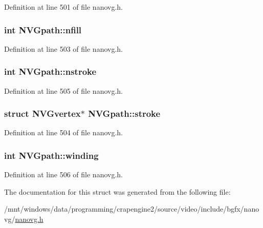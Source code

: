 Definition at line 501 of file nanovg.\+h.

\hypertarget{struct_n_v_gpath_a1301e4eaf5ae42646eb25295f9e1ccd8}{
\subsubsection[{nfill}]{\setlength{\rightskip}{0pt plus 5cm}int N\+V\+Gpath\+::nfill}}\label{struct_n_v_gpath_a1301e4eaf5ae42646eb25295f9e1ccd8}


Definition at line 503 of file nanovg.\+h.

\hypertarget{struct_n_v_gpath_ab855f1ca7f88f871410a9c326fe4f207}{
\subsubsection[{nstroke}]{\setlength{\rightskip}{0pt plus 5cm}int N\+V\+Gpath\+::nstroke}}\label{struct_n_v_gpath_ab855f1ca7f88f871410a9c326fe4f207}


Definition at line 505 of file nanovg.\+h.

\hypertarget{struct_n_v_gpath_a3376451a0d636e69cfb1e8988feaf780}{
\subsubsection[{stroke}]{\setlength{\rightskip}{0pt plus 5cm}struct {\bf N\+V\+Gvertex}$\ast$ N\+V\+Gpath\+::stroke}}\label{struct_n_v_gpath_a3376451a0d636e69cfb1e8988feaf780}


Definition at line 504 of file nanovg.\+h.

\hypertarget{struct_n_v_gpath_aefa1aea3e295c4934fe89b5e1eb58e59}{
\subsubsection[{winding}]{\setlength{\rightskip}{0pt plus 5cm}int N\+V\+Gpath\+::winding}}\label{struct_n_v_gpath_aefa1aea3e295c4934fe89b5e1eb58e59}


Definition at line 506 of file nanovg.\+h.



The documentation for this struct was generated from the following file\+:\begin{DoxyCompactItemize}
\item 
/mnt/windows/data/programming/crapengine2/source/video/include/bgfx/nanovg/\hyperlink{nanovg_8h}{nanovg.\+h}\end{DoxyCompactItemize}
